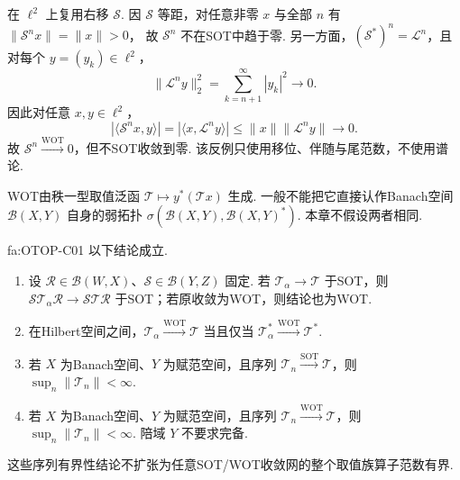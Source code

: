 \begin{FACounterexample}[弱算子拓扑收敛不推出强算子拓扑收敛]\label{i11:wot-not-sot}
在 \(\displaystyle \ell^2\) 上复用右移 \(\displaystyle \mathcal S\). 因 \(\displaystyle \mathcal S\) 等距，对任意非零 \(\displaystyle x\) 与全部 \(\displaystyle n\) 有
\(\displaystyle \|\mathcal S^nx\|=\|x\|>0\)，
故 \(\displaystyle \mathcal S^n\) 不在SOT中趋于零. 另一方面，\(\displaystyle (\mathcal S^*)^n=\mathcal L^n\)，且对每个 \(\displaystyle y=(y_k)\in\ell^2\)，
\[
\|\mathcal L^ny\|_2^2
=\sum_{k=n+1}^{\infty}|y_k|^2
\longrightarrow0.
\]
因此对任意 \(\displaystyle x,y\in\ell^2\)，
\[
|\langle\mathcal S^nx,y\rangle|
=|\langle x,\mathcal L^ny\rangle|
\leqslant\|x\|\|\mathcal L^ny\|
\longrightarrow0.
\]
故 \(\displaystyle \mathcal S^n\overset{\mathrm{WOT}}{\longrightarrow}0\)，但不SOT收敛到零. 该反例只使用移位、伴随与尾范数，不使用谱论.
\end{FACounterexample}

\begin{FAWarning}[弱算子拓扑不是一般的Banach空间弱拓扑]
WOT由秩一型取值泛函 \(\displaystyle \mathcal T\mapsto y^*(\mathcal T x)\) 生成. 一般不能把它直接认作Banach空间 \(\displaystyle \mathcal B(X,Y)\) 自身的弱拓扑 \(\displaystyle \sigma(\mathcal B(X,Y),\mathcal B(X,Y)^*)\). 本章不假设两者相同.
\end{FAWarning}

\begin{FAProposition}[C][算子拓扑收敛工具]{fa:OTOP-C01}
以下结论成立.
\begin{enumerate}[label=\textnormal{(\roman*)}]
\item 设 \(\displaystyle \mathcal R\in\mathcal B(W,X)\)、\(\displaystyle \mathcal S\in\mathcal B(Y,Z)\) 固定. 若 \(\displaystyle \mathcal T_\alpha\to\mathcal T\) 于SOT，则 \(\displaystyle \mathcal S\mathcal T_\alpha\mathcal R\to\mathcal S\mathcal T\mathcal R\) 于SOT；若原收敛为WOT，则结论也为WOT.
\item 在Hilbert空间之间，\(\displaystyle \mathcal T_\alpha\overset{\mathrm{WOT}}{\longrightarrow}\mathcal T\) 当且仅当 \(\displaystyle \mathcal T_\alpha^*\overset{\mathrm{WOT}}{\longrightarrow}\mathcal T^*\).
\item 若 \(\displaystyle X\) 为Banach空间、\(\displaystyle Y\) 为赋范空间，且序列 \(\displaystyle \mathcal T_n\overset{\mathrm{SOT}}{\longrightarrow}\mathcal T\)，则 \(\displaystyle \sup_n\|\mathcal T_n\|<\infty\).
\item 若 \(\displaystyle X\) 为Banach空间、\(\displaystyle Y\) 为赋范空间，且序列 \(\displaystyle \mathcal T_n\overset{\mathrm{WOT}}{\longrightarrow}\mathcal T\)，则 \(\displaystyle \sup_n\|\mathcal T_n\|<\infty\). 陪域 \(\displaystyle Y\) 不要求完备.
\end{enumerate}
这些序列有界性结论不扩张为任意SOT/WOT收敛网的整个取值族算子范数有界.
\end{FAProposition}

